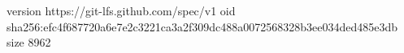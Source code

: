 version https://git-lfs.github.com/spec/v1
oid sha256:efc4f687720a6e7e2c3221ca3a2f309dc488a0072568328b3ee034ded485e3db
size 8962
